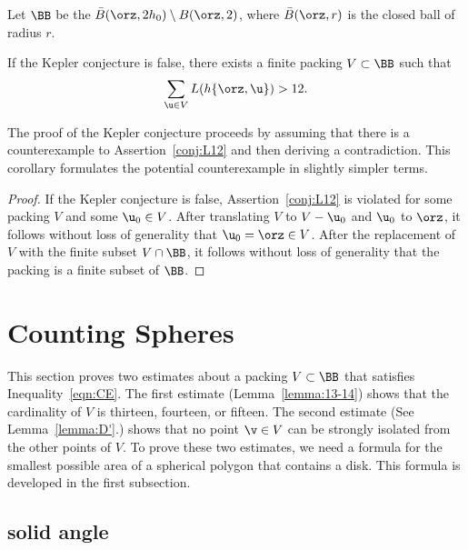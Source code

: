 \begin{definition}[$\BB$] 
   Let $\BB$ be the 
  $\bar B(\orz,2h_0)\setminus B(\orz,2)$, where $\bar B(\orz,r)$ is
  the closed ball of radius $r$.  
\end{definition}


\begin{corollary}\label{cor:CE} 
  If the Kepler conjecture is false, there exists a finite packing
  $V\subset\BB$ such that
\begin{equation}\label{eqn:CE} 
\sum_{ \u\in V} L(h\{\orz, \u\}) > 12.
\end{equation}
\end{corollary}

The proof of the Kepler conjecture proceeds by assuming that there is
a counterexample to Assertion~\ref{conj:L12} and then deriving a
contradiction.  This corollary formulates the potential counterexample
in slightly simpler terms.

\begin{proof} If the Kepler conjecture is false,
  Assertion~\ref{conj:L12} is violated for some packing $ V$ and some
  $ \u_0\in V$.  After translating  $ V$ to $ V - \u_0$ and $
  \u_0$ to $\orz$, it follows without loss of generality that $
  \u_0=\orz\in V$.  After the replacement of $ V$ with the finite
  subset $V\cap \BB$, it follows without loss of generality that the
  packing is a finite subset of $\BB$.
\end{proof}



\section{Counting Spheres}

This section proves two estimates about a packing $V\subset \BB$ that
satisfies Inequality~\ref{eqn:CE}.  The first estimate
(Lemma~\ref{lemma:13-14}) shows that the cardinality of $V$ is
thirteen, fourteen, or fifteen.  The second estimate (See
Lemma~\ref{lemma:D'}.)  shows that no point $\v\in V$ can be strongly
isolated from the other points of $V$.  To prove these two estimates,
we need a formula for the smallest possible area of a spherical
polygon that contains a disk.  This formula is developed in the first
subsection.

\subsection{solid angle}
%
%

